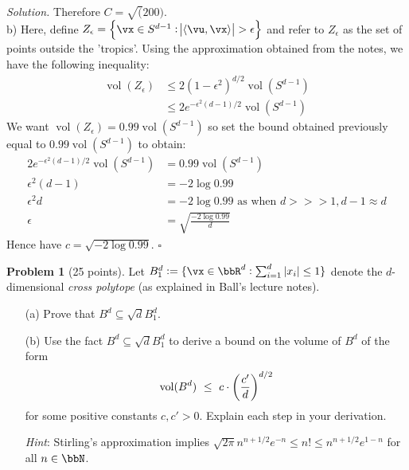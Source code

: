 \documentclass[11pt]{article}
\newcommand\ip[1]{\langle #1 \rangle} %
\newcommand{\vol}{\ensuremath{\operatorname{vol}}} %
\newcommand{\unitball}[1][d]{\ensuremath{B^{#1}}} %
\newcommand{\unitsphere}[1][d-1]{\ensuremath{S^{#1}}} %
\theoremstyle{definition}
\newtheorem{problem}{Problem}
\newenvironment{solution}{\noindent\emph{Solution.}}{\hfill$\square$}
\begin{document}
\begin{solution}
Therefore $C = \sqrt(200)$.
\newline
\\ b) Here, define $Z_\epsilon = \cbr{\vx \in \unitsphere : \abs{\ip{\vu,\vx}} > \epsilon}$ and refer to $Z_\epsilon$ as the set of points outside the 'tropics'. Using the approximation obtained from the notes, we have the following inequality:
\begin{align*}
\vol(Z_\epsilon) 
&\leq 2(1 - \epsilon^2)^{d/2} \vol(\unitsphere) \\
&\leq 2e^{-\epsilon^2 (d-1)/2} \vol(\unitsphere)
\end{align*}
We want $\vol(Z_\epsilon) = 0.99\vol(\unitsphere)$ so set the bound obtained previously equal to $0.99\vol(\unitsphere)$ to obtain:
\begin{align*}
2e^{-\epsilon^2 (d-1)/2} \vol(\unitsphere) 
&= 0.99\vol(\unitsphere) \\
\epsilon^2 (d-1)
&= -2 \log 0.99 \\
\epsilon^2 d
&= -2 \log 0.99 \textrm{ as when } d >>> 1, d - 1 \approx d  \\
\epsilon 
&= \sqrt{\frac{-2 \log 0.99}{d}}
\end{align*}
Hence have $c = \sqrt{-2 \log 0.99}$.
\end{solution}

\newpage


\begin{problem}[25 points]
  Let $B_1^d := \cbr[0]{ \vx \in \bbR^d : \sum_{i=1}^d |x_i| \leq 1 }$ denote the $d$-dimensional \emph{cross polytope} (as explained in Ball's lecture notes).
  \begin{enumerate}
    \item[(a)]
      Prove that $\unitball \subseteq \sqrt{d} B_1^d$.

    \item[(b)]
      Use the fact $\unitball \subseteq \sqrt{d} B_1^d$ to derive a bound on the volume of $\unitball$ of the form
      \[
        \vol(\unitball)
        \ \leq \
        c \cdot \del{ \frac{c'}{d} }^{d/2}
      \]
      for some positive constants $c, c' >0$.
      Explain each step in your derivation.

      \emph{Hint}: Stirling's approximation implies $\sqrt{2\pi} n^{n+1/2}e^{-n} \leq n! \leq n^{n+1/2}e^{1-n}$ for all $n \in \bbN$.
  \end{enumerate}
\end{problem}
\end{document}

